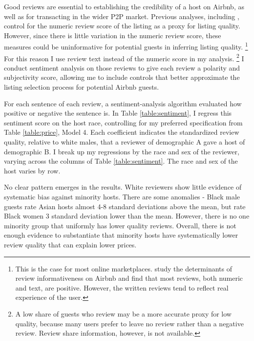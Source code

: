 Good reviews are essential to establishing the credibility of a host on Airbnb, as well as for transacting in the wider P2P market. Previous analyses, including \cite{edelman}, control for the numeric review score of the listing as a proxy for listing quality. However, since there is little variation in the numeric review score, these measures could be uninformative for potential guests in inferring listing quality.%
	\footnote{This is the case for most online marketplaces. \cite{fradkin} study the determinants of review informativeness on Airbnb and find that most reviews, both numeric and text, are positive. However, the written reviews tend to reflect real experience of the user.} 
For this reason I use review text instead of the numeric score in my analysis.%
	\footnote{A low share of guests who review may be a more accurate proxy for low quality, because many users prefer to leave no review rather than a negative review. Review share information, however, is not available.} 
I conduct sentiment analysis on those reviews to give each review a polarity and subjectivity score, allowing me to include controls that better approximate the listing selection process for potential Airbnb guests.

For each sentence of each review, a sentiment-analysis algorithm evaluated how positive or negative the sentence is. In Table \ref{table:sentiment}, I regress this sentiment score on the host race, controlling for my preferred specification from Table \ref{table:price}, Model 4. Each coefficient indicates the standardized review quality, relative to white males, that a reviewer of demographic A gave a host of demographic B. I break up my regressions by the race and sex of the reviewer, varying across the columns of Table \ref{table:sentiment}. The race and sex of the host varies by row. 

No clear pattern emerges in the results. White reviewers show little evidence of systematic bias against minority hosts. There are some anomalies - Black male guests rate Asian hosts almost 4-8 standard deviations above the mean, but rate Black women 3 standard deviation lower than the mean. However, there is no one minority group that uniformly has lower quality reviews. Overall, there is not enough evidence to substantiate that minority hosts have systematically lower review quality that can explain lower prices. 













